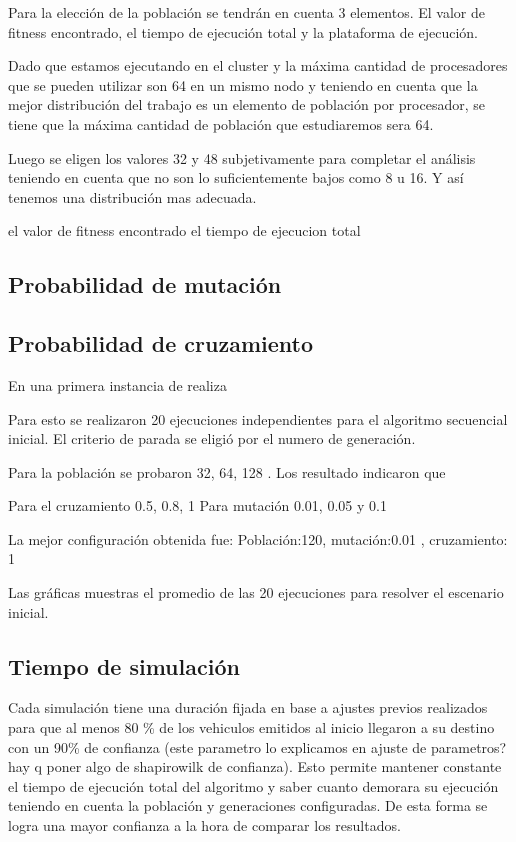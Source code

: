 Para la elección de la población se tendrán en cuenta 3 elementos. El valor de fitness encontrado, el tiempo de ejecución total y la plataforma de ejecución.

Dado que estamos ejecutando en el cluster y la máxima cantidad de procesadores que se pueden utilizar son 64 en un mismo nodo y teniendo en cuenta que la mejor distribución del trabajo es un elemento de población por procesador, se tiene que la máxima cantidad de población que estudiaremos sera 64.

Luego se eligen los valores 32 y 48 subjetivamente para completar el análisis teniendo en cuenta que no son lo suficientemente bajos como 8 u 16. Y así tenemos una distribución mas adecuada.



el valor de fitness encontrado
el tiempo de ejecucion total




\subsection{Probabilidad de mutación}

\subsection{Probabilidad de cruzamiento}
En una primera instancia de realiza 

Para esto se realizaron 20 ejecuciones independientes para el algoritmo secuencial inicial.
El criterio de parada se eligió por el numero de generación.

Para la población se probaron 32, 64, 128 . Los resultado indicaron que 

Para el cruzamiento 0.5, 0.8, 1
Para mutación 0.01, 0.05 y 0.1

La mejor  configuración obtenida fue:
Población:120, mutación:0.01 , cruzamiento: 1

Las gráficas muestras el promedio de las 20 ejecuciones para resolver el escenario inicial.


\subsection{Tiempo de simulación}

Cada simulación tiene una duración fijada en base a ajustes previos realizados para que al menos 80 \% de los vehiculos emitidos al inicio llegaron a su destino con un 90\% de confianza (este parametro lo explicamos en ajuste de parametros? hay q poner algo de shapirowilk de confianza).
Esto  permite mantener constante el tiempo de ejecución total del algoritmo y saber cuanto demorara su ejecución teniendo en cuenta la población y generaciones configuradas. De esta forma se logra una mayor confianza a la hora de comparar los resultados.



